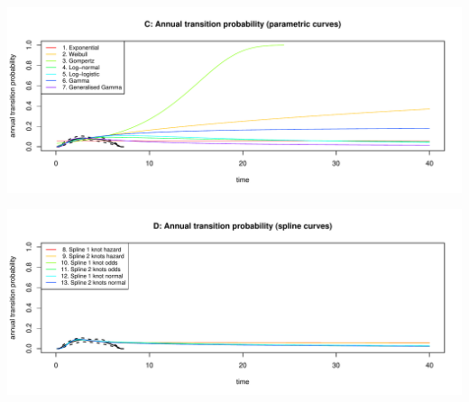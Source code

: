 \documentclass[]{article}
\begin{document}
\begin{flushleft}\includegraphics[height=0.29\textheight]{images/validate_extrapolation1-3} \end{flushleft}

\begin{flushleft}\includegraphics[height=0.29\textheight]{images/validate_extrapolation1-4} \end{flushleft}
\end{document}
